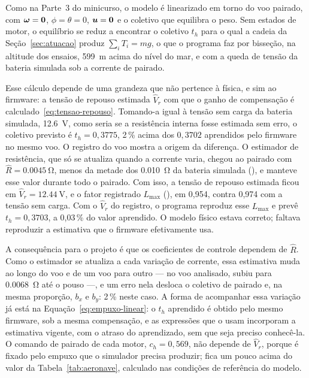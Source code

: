 Como na Parte~3 do minicurso, o modelo é linearizado em torno do voo pairado,
com $\bm{\omega} = \bm{0}$, $\phi = \theta = 0$, $\bm{u} = \bm{0}$
e o coletivo que equilibra o peso. Sem estados de motor, o equilíbrio se
reduz a encontrar o coletivo $t_h$ para o qual a cadeia da
Seção~\ref{sec:atuacao} produz $\sum_i T_i = mg$, o que o programa faz por
bisseção, na altitude dos ensaios, \SI{599}{\metre} acima do nível do mar, e
com a queda de tensão da bateria simulada sob a corrente de pairado.

Esse cálculo depende de uma grandeza que não pertence à física, e sim ao
firmware: a tensão de repouso estimada $\hat V_r$ com que o ganho de
compensação é calculado~\eqref{eq:tensao-repouso}. Tomando-a igual à tensão
sem carga da bateria simulada, \SI{12.6}{\volt}, como seria se a resistência
interna fosse estimada sem erro, o coletivo previsto é $t_h = 0{,}3775$, 2\,\%
acima dos $0{,}3702$ aprendidos pelo firmware no mesmo voo. O registro do voo
mostra a origem da diferença. O estimador de resistência, que só se atualiza
quando a corrente varia, chegou ao pairado com $\hat R = \SI{0.0045}{\ohm}$,
menos da metade dos \SI{0.010}{\ohm} da bateria simulada
(), e manteve esse valor durante todo o pairado.
Com isso, a tensão de repouso estimada ficou em $\hat V_r = \SI{12.44}{\volt}$,
e o fator registrado $L_{\max}$ (), em 0,954, contra
0,974 com a tensão sem carga. Com o $\hat V_r$ do registro, o programa
reproduz esse $L_{\max}$ e prevê $t_h = 0{,}3703$, a 0,03\,\% do valor
aprendido. O modelo físico estava correto; faltava reproduzir a estimativa
que o firmware efetivamente usa.

A consequência para o projeto é que os coeficientes de controle dependem de
$\hat R$. Como o estimador se atualiza a cada variação de corrente, essa
estimativa muda ao longo do voo e de um voo para outro --- no voo analisado,
subiu para \SI{0.0068}{\ohm} até o pouso ---, e um erro nela desloca o
coletivo de pairado e, na mesma proporção, $b_x$ e $b_y$: 2\,\% neste caso.
A forma de acompanhar essa variação já está na
Equação~\eqref{eq:empuxo-linear}: o $t_h$ aprendido é obtido pelo mesmo
firmware, sob a mesma compensação, e as expressões que o usam incorporam a
estimativa vigente, com o atraso do aprendizado, sem que seja preciso
conhecê-la. O comando de pairado de cada motor, $c_h = 0{,}569$, não depende
de $\hat V_r$, porque é fixado pelo empuxo que o simulador precisa produzir;
fica um pouco acima do valor da Tabela~\ref{tab:aeronave}, calculado nas
condições de referência do modelo.

